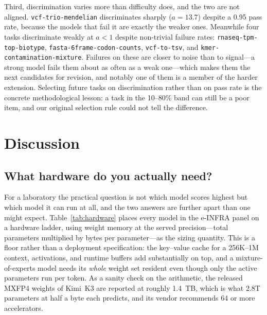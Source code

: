 \documentclass[11pt]{article}
\begin{document}
Third, discrimination varies more than difficulty does, and the two are not aligned.
\texttt{vcf-trio-mendelian} discriminates sharply ($a = 13.7$) despite a 0.95 pass rate, because the models that fail it are exactly the weaker ones.
Meanwhile four tasks discriminate weakly at $a < 1$ despite non-trivial failure rates: \texttt{rnaseq-tpm-top-biotype}, \texttt{fasta-6frame-codon-counts}, \texttt{vcf-to-tsv}, and \texttt{kmer-contamination-mixture}.
Failures on these are closer to noise than to signal---a strong model fails them about as often as a weak one---which makes them the next candidates for revision, and notably one of them is a member of the harder extension.
Selecting future tasks on discrimination rather than on pass rate is the concrete methodological lesson: a task in the 10--80\% band can still be a poor item, and our original selection rule could not tell the difference.

\section{Discussion}

\subsection*{What hardware do you actually need?}
\label{sec:deployment}

For a laboratory the practical question is not which model scores highest but which model it can run at all, and the two answers are further apart than one might expect.
Table~\ref{tab:hardware} places every model in the e-INFRA panel on a hardware ladder, using weight memory at the served precision---total parameters multiplied by bytes per parameter---as the sizing quantity.
This is a floor rather than a deployment specification: the key--value cache for a 256K--1M context, activations, and runtime buffers add substantially on top, and a mixture-of-experts model needs its \emph{whole} weight set resident even though only the active parameters run per token.
As a sanity check on the arithmetic, the released MXFP4 weights of Kimi~K3 are reported at roughly 1.4~TB, which is what 2.8T parameters at half a byte each predicts, and its vendor recommends 64 or more accelerators.

\begin{table}[tbp]
\centering
\small
\caption{What it takes to self-host each model in the e-INFRA panel. Weight memory is total parameters at the served precision and excludes KV cache and runtime overhead. Tier A models are within reach of a workstation once quantised to four bits; tier E needs a multi-node cluster.}
\label{tab:hardware}

\end{table}
\end{document}
